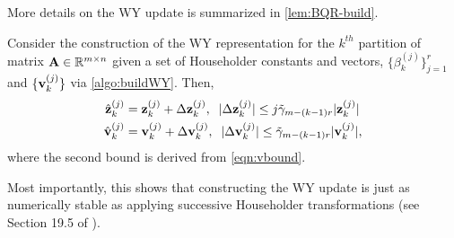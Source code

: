 More details on the WY update is summarized in \cref{lem:BQR-build}.
\begin{lemma}\label{lem:BQR-build}
	Consider the construction of the WY representation for the $k^{th}$ partition of matrix $\mathbf{A}\in\mathbb{R}^{m\times n}$ given a set of Householder constants and vectors, $\{\beta_k^{(j)}\}_{j=1}^r$ and $\{\mathbf{v}_{k}^{(j)}\}$ via \cref{algo:buildWY}.
	Then, 
	\begin{align}
		\hat{\bb{z}}_{k}^{(j)}& = \bb{z}_{k}^{(j)} + \Delta \bb{z}_{k}^{(j)},\;\; |\Delta \bb{z}_{k}^{(j)}| \leq j\tilde{\gamma}_{m-(k-1)r} |\bb{z}_{k}^{(j)}|\label{eqn:BQR-z}\\
		\hat{\bb{v}}_{k}^{(j)}& = \bb{v}_{k}^{(j)} + \Delta \bb{v}_{k}^{(j)},\;\; |\Delta \bb{v}_{k}^{(j)}| \leq \tilde{\gamma}_{m-(k-1)r} |\bb{v}_{k}^{(j)}|\label{eqn:BQR-v},
	\end{align}
	where the second bound is derived from \cref{eqn:vbound}.
\end{lemma}
Most importantly, this shows that constructing the WY update is just as numerically stable as applying successive Householder transformations (see Section 19.5 of \cite{Higham2002}).

